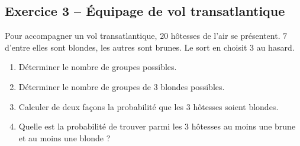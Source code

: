 \documentclass[11pt,a4paper]{article}
\begin{document}
\vspace{0.3cm}

\subsection*{Exercice 3 -- Équipage de vol transatlantique}

Pour accompagner un vol transatlantique, $20$ hôtesses de l'air se présentent. $7$ d'entre elles sont blondes, les autres sont brunes. Le sort en choisit $3$ au hasard.
\begin{enumerate}[label=\arabic*.]
    \item Déterminer le nombre de groupes possibles.
    \item Déterminer le nombre de groupes de 3 blondes possibles.
    \item Calculer de deux façons la probabilité que les 3 hôtesses soient blondes.
    \item Quelle est la probabilité de trouver parmi les 3 hôtesses au moins une brune et au moins une blonde ?
\end{enumerate}
\end{document}
